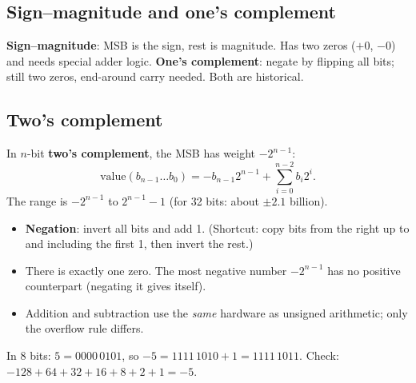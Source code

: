 \subsection{Sign--magnitude and one's complement}

\textbf{Sign--magnitude}: MSB is the sign, rest is magnitude. Has two zeros
($+0$, $-0$) and needs special adder logic. \textbf{One's complement}: negate
by flipping all bits; still two zeros, end-around carry needed. Both are
historical.

\subsection{Two's complement}

\begin{definition}
In $n$-bit \textbf{two's complement}, the MSB has weight $-2^{n-1}$:
\[
\text{value}(b_{n-1}\ldots b_0) = -b_{n-1}2^{n-1} + \sum_{i=0}^{n-2} b_i 2^i.
\]
The range is $-2^{n-1}$ to $2^{n-1} - 1$ (for 32 bits: about $\pm 2.1$
billion).
\end{definition}

\begin{itemize}
  \item \textbf{Negation}: invert all bits and add 1. (Shortcut: copy bits
    from the right up to and including the first 1, then invert the rest.)
  \item There is exactly one zero. The most negative number $-2^{n-1}$ has
    no positive counterpart (negating it gives itself).
  \item Addition and subtraction use the \emph{same} hardware as unsigned
    arithmetic; only the overflow rule differs.
\end{itemize}

\begin{example}
In 8 bits: $5 = 0000\,0101$, so $-5 = 1111\,1010 + 1 = 1111\,1011$.
Check: $-128 + 64 + 32 + 16 + 8 + 2 + 1 = -5$.
\end{example}

